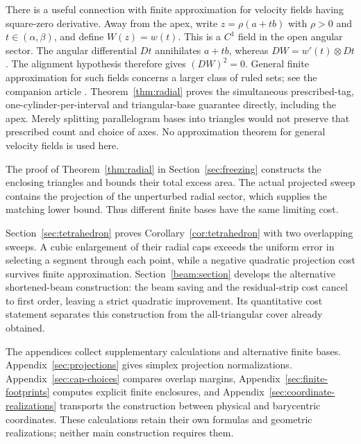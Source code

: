 There is a useful connection with finite approximation for velocity
fields having square-zero derivative. Away from the apex, write
$z=\rho(a+tb)$ with $\rho>0$ and $t\in(\alpha,\beta)$, and define
$W(z)=w(t)$. This is a $C^1$ field in the open angular sector.
The angular differential $Dt$ annihilates $a+tb$, whereas
$DW=w'(t)\otimes Dt$. The alignment hypothesis therefore gives
$(DW)^2=0$. General finite approximation for such fields concerns a
larger class of ruled sets; see the companion article
\cite[Theorem~1.2 and Section~3]{RuledApproximation2026}. Theorem~\ref{thm:radial} proves the
simultaneous prescribed-tag, one-cylinder-per-interval and triangular-base
guarantee directly, including the apex. Merely splitting parallelogram
bases into triangles would not preserve that prescribed count and choice
of axes. No approximation theorem for general velocity fields is used here.

The proof of Theorem~\ref{thm:radial} in
Section~\ref{sec:freezing} constructs the enclosing triangles and
bounds their total excess area. The actual projected sweep contains
the projection of the unperturbed radial sector, which supplies the matching lower
bound. Thus different finite bases have the same limiting cost.

Section~\ref{sec:tetrahedron} proves Corollary~\ref{cor:tetrahedron}
with two overlapping sweeps. A cubic enlargement of their radial caps
exceeds the uniform error in selecting a segment through each point,
while a negative quadratic projection cost survives finite
approximation. Section~\ref{beam:section} develops the alternative
shortened-beam construction: the beam saving and the residual-strip
cost cancel to first order, leaving a strict quadratic improvement.
Its quantitative cost statement separates this construction from the
all-triangular cover already obtained.

The appendices collect supplementary calculations and alternative
finite bases. Appendix~\ref{sec:projections} gives simplex projection
normalizations. Appendix~\ref{sec:cap-choices} compares overlap
margins, Appendix~\ref{sec:finite-footprints} computes explicit finite
enclosures, and Appendix~\ref{sec:coordinate-realizations} transports
the construction between physical and barycentric coordinates.
These calculations retain their own formulas and geometric
realizations; neither main construction requires them.
